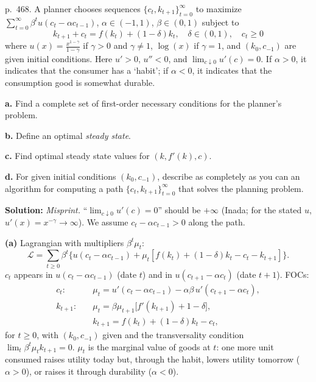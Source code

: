 \documentclass[12pt, letterpaper]{article}
\begin{document}
\begin{tcolorbox}[evenbox,title={Exercise 11.18 \quad Habits and durability}]
\begin{tcolorbox}[questionbox]
p.~468. A planner chooses sequences $\{c_t,k_{t+1}\}_{t=0}^\infty$ to maximize
$\sum_{t=0}^\infty\beta^tu(c_t-\alpha c_{t-1})$, $\alpha\in(-1,1)$, $\beta\in(0,1)$ subject to
\[
k_{t+1}+c_t=f(k_t)+(1-\delta)k_t,\quad\delta\in(0,1),\quad c_t\ge0
\]
where $u(x)=\frac{x^{1-\gamma}}{1-\gamma}$ if $\gamma>0$ and $\gamma\ne1$, $\log(x)$ if $\gamma=1$, and $(k_0,c_{-1})$ are
given initial conditions. Here $u'>0$, $u''<0$, and $\lim_{c\downarrow0}u'(c)=0$. If $\alpha>0$, it indicates that the
consumer has a `habit'; if $\alpha<0$, it indicates that the consumption good is somewhat durable.

\textbf{a.} Find a complete set of first-order necessary conditions for the planner's problem.

\textbf{b.} Define an optimal \emph{steady state}.

\textbf{c.} Find optimal steady state values for $(k,f'(k),c)$.

\textbf{d.} For given initial conditions $(k_0,c_{-1})$, describe as completely as you can an algorithm for computing a
path $\{c_t,k_{t+1}\}_{t=0}^\infty$ that solves the planning problem.
\end{tcolorbox}

\textbf{Solution:} \emph{Misprint.} ``$\lim_{c\downarrow0}u'(c)=0$'' should be $+\infty$ (Inada; for the stated $u$,
$u'(x)=x^{-\gamma}\to\infty$). We assume $c_t-\alpha c_{t-1}>0$ along the path.

\textbf{(a)} Lagrangian with multipliers $\beta^t\mu_t$:
\[
\mathcal L=\sum_{t\ge0}\beta^t\big\{u(c_t-\alpha c_{t-1})+\mu_t[f(k_t)+(1-\delta)k_t-c_t-k_{t+1}]\big\}.
\]
$c_t$ appears in $u(c_t-\alpha c_{t-1})$ (date $t$) and in $u(c_{t+1}-\alpha c_t)$ (date $t+1$). FOCs:
\begin{align*}
c_t:&\quad \mu_t=u'(c_t-\alpha c_{t-1})-\alpha\beta\,u'(c_{t+1}-\alpha c_t),\tag{11.18.1}\\
k_{t+1}:&\quad \mu_t=\beta\mu_{t+1}\big[f'(k_{t+1})+1-\delta\big],\tag{11.18.2}\\
&\quad k_{t+1}=f(k_t)+(1-\delta)k_t-c_t,\tag{11.18.3}
\end{align*}
for $t\ge0$, with $(k_0,c_{-1})$ given and the transversality condition $\lim_t\beta^t\mu_tk_{t+1}=0$. $\mu_t$ is the
marginal value of goods at $t$: one more unit consumed raises utility today but, through the habit, lowers utility
tomorrow ($\alpha>0$), or raises it through durability ($\alpha<0$).


\end{tcolorbox}
\end{document}

